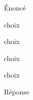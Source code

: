 \begin{exercice}
    Énoncé
    \begin{ChoixQCM}{4}
        \item choix
        \item choix
        \item choix
        \item choix
    \end{ChoixQCM}
\end{exercice}
\begin{corrige}
    Réponse  
\end{corrige}